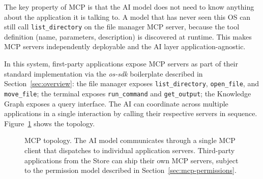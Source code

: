 The key property of MCP is that the AI model does not need to know anything
about the application it is talking to. A model that has never seen this OS
can still call \texttt{list\_directory} on the file manager MCP server,
because the tool definition (name, parameters, description) is discovered at
runtime. This makes MCP servers independently deployable and the AI layer
application-agnostic.

In this system, first-party applications expose MCP servers as part of their
standard implementation via the \emph{os-sdk} boilerplate described in
Section~\ref{sec:overview}: the file manager exposes \texttt{list\_directory},
\texttt{open\_file}, and \texttt{move\_file}; the terminal exposes
\texttt{run\_command} and \texttt{get\_output}; the Knowledge Graph exposes a
query interface. The AI can coordinate across multiple applications in a single
interaction by calling their respective servers in sequence.
Figure~\ref{fig:mcp} shows the topology.

\begin{figure}[htbp]
	\centering

\caption{MCP topology. The AI model communicates through a single MCP client
that dispatches to individual application servers. Third-party applications
from the Store can ship their own MCP servers, subject to the permission model
described in Section~\ref{sec:mcp-permissions}.}
\label{fig:mcp}
\end{figure}


